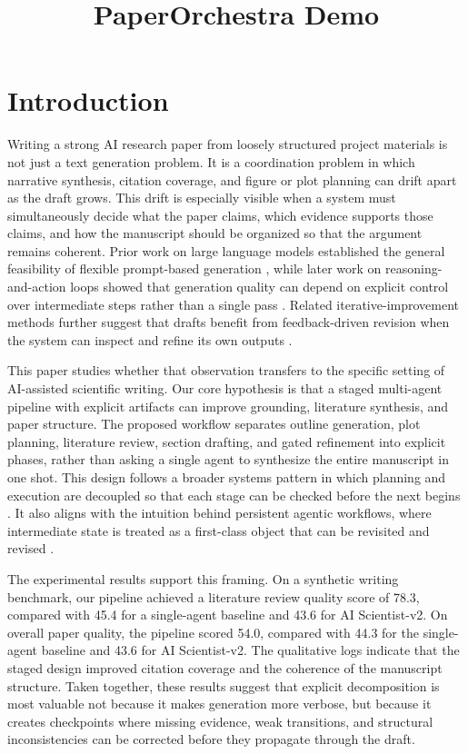 \documentclass{article}
\begin{document}
\title{PaperOrchestra Demo}
\maketitle
\section{Introduction}

Writing a strong AI research paper from loosely structured project materials is not just a text generation problem. It is a coordination problem in which narrative synthesis, citation coverage, and figure or plot planning can drift apart as the draft grows. This drift is especially visible when a system must simultaneously decide what the paper claims, which evidence supports those claims, and how the manuscript should be organized so that the argument remains coherent. Prior work on large language models established the general feasibility of flexible prompt-based generation \cite{author2024LanguageModelsAre}, while later work on reasoning-and-action loops showed that generation quality can depend on explicit control over intermediate steps rather than a single pass \cite{author2024ReactSynergizingReasoning,author2024TreeOfThoughts,author2024PlanAndExecute}. Related iterative-improvement methods further suggest that drafts benefit from feedback-driven revision when the system can inspect and refine its own outputs \cite{author2024SelfRefine,author2024Reflexion}.

This paper studies whether that observation transfers to the specific setting of AI-assisted scientific writing. Our core hypothesis is that a staged multi-agent pipeline with explicit artifacts can improve grounding, literature synthesis, and paper structure. The proposed workflow separates outline generation, plot planning, literature review, section drafting, and gated refinement into explicit phases, rather than asking a single agent to synthesize the entire manuscript in one shot. This design follows a broader systems pattern in which planning and execution are decoupled so that each stage can be checked before the next begins \cite{author2024PlanAndExecute,author2024TreeOfThoughts}. It also aligns with the intuition behind persistent agentic workflows, where intermediate state is treated as a first-class object that can be revisited and revised \cite{author2024GenerativeAgentsInteractive,author2024Reflexion}.

The experimental results support this framing. On a synthetic writing benchmark, our pipeline achieved a literature review quality score of 78.3, compared with 45.4 for a single-agent baseline and 43.6 for AI Scientist-v2. On overall paper quality, the pipeline scored 54.0, compared with 44.3 for the single-agent baseline and 43.6 for AI Scientist-v2. The qualitative logs indicate that the staged design improved citation coverage and the coherence of the manuscript structure. Taken together, these results suggest that explicit decomposition is most valuable not because it makes generation more verbose, but because it creates checkpoints where missing evidence, weak transitions, and structural inconsistencies can be corrected before they propagate through the draft.
\end{document}
